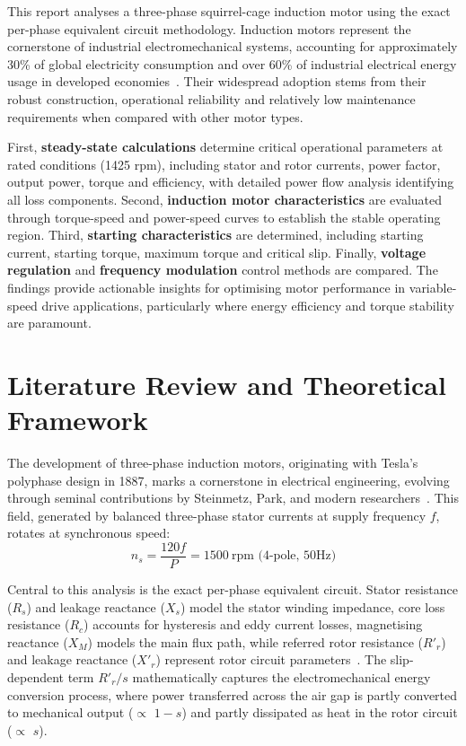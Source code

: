 \documentclass[a4paper,11pt]{IEEEtran}
\begin{document}
This report analyses a three-phase squirrel-cage induction motor using the exact per-phase equivalent circuit methodology. Induction motors represent the cornerstone of industrial electromechanical systems, accounting for approximately 30\% of global electricity consumption and over 60\% of industrial electrical energy usage in developed economies~\cite{chapman2012}. Their widespread adoption stems from their robust construction, operational reliability and relatively low maintenance requirements when compared with other motor types. 

First,\textbf{ steady-state calculations} determine critical operational parameters at rated conditions (1425 rpm), including stator and rotor currents, power factor, output power, torque and efficiency, with detailed power flow analysis identifying all loss components. Second,\textbf{ induction motor characteristics} are evaluated through torque-speed and power-speed curves to establish the stable operating region. Third,\textbf{ starting characteristics} are determined, including starting current, starting torque, maximum torque and critical slip. Finally, \textbf{voltage regulation} and \textbf{frequency modulation} control methods are compared. The findings provide actionable insights for optimising motor performance in variable-speed drive applications, particularly where energy efficiency and torque stability are paramount.  
 
 

 \section{Literature Review and Theoretical Framework}

The development of three-phase induction motors, originating with Tesla’s polyphase design in 1887, marks a cornerstone in electrical engineering, evolving through seminal contributions by Steinmetz, Park, and modern researchers~\cite{fitzgerald2020}. This field, generated by balanced three-phase stator currents at supply frequency \( f \), rotates at synchronous speed:
\begin{equation}
n_s =\frac{120f}{P}=1500~\text{rpm} \text{ (4-pole, 50Hz)}
\end{equation}

Central to this analysis is the exact per-phase equivalent circuit. Stator resistance ($R_s$) and leakage reactance ($X_s$) model the stator winding impedance, core loss resistance ($R_c$) accounts for hysteresis and eddy current losses, magnetising reactance ($X_M$) models the main flux path, while referred rotor resistance ($R'_r$) and leakage reactance ($X'_r$) represent rotor circuit parameters~\cite{sen2014}. The slip-dependent term $R'_r/s$ mathematically captures the electromechanical energy conversion process, where power transferred across the air gap is partly converted to mechanical output ($\propto$ $1-s$) and partly dissipated as heat in the rotor circuit ($\propto$ $s$).
\end{document}
